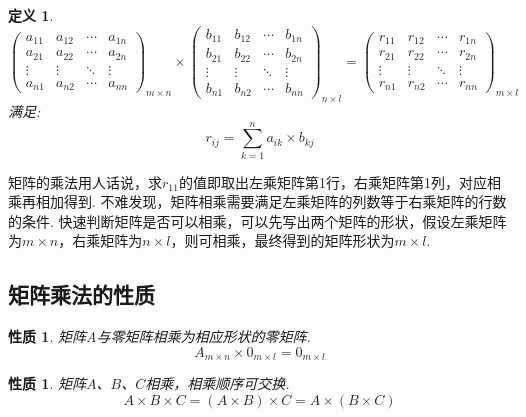 \documentclass[12pt, a4paper, oneside]{ctexbook}
\newtheorem{definition}[theorem]{定义}
\newtheorem{quolity}[theorem]{性质}
\begin{document}
\begin{definition}
    $$\left ( \begin{matrix}
        a_{11} & a_{12} & \cdots & a_{1n} \\
        a_{21} & a_{22} & \cdots & a_{2n} \\
        \vdots & \vdots & \ddots & \vdots \\
        a_{n1} & a_{n2} & \cdots & a_{nn}
    \end{matrix} \right )_{m \times n} \times \left ( \begin{matrix}
        b_{11} & b_{12} & \cdots & b_{1n} \\
        b_{21} & b_{22} & \cdots & b_{2n} \\
        \vdots & \vdots & \ddots & \vdots \\
        b_{n1} & b_{n2} & \cdots & b_{nn}
    \end{matrix} \right )_{n \times l} = \left ( \begin{matrix}
        r_{11} & r_{12} & \cdots & r_{1n} \\
        r_{21} & r_{22} & \cdots & r_{2n} \\
        \vdots & \vdots & \ddots & \vdots \\
        r_{n1} & r_{n2} & \cdots & r_{nn}
    \end{matrix} \right )_{m \times l}$$
    满足: $$r_{ij} = \sum_{k=1}^n a_{ik} \times b_{kj}$$
\end{definition}

矩阵的乘法用人话说，求$r_{11}$的值即取出左乘矩阵第1行，右乘矩阵第1列，对应相乘再相加得到. 不难发现，矩阵相乘需要满足左乘矩阵的列数等于右乘矩阵的行数的条件. 
快速判断矩阵是否可以相乘，可以先写出两个矩阵的形状，假设左乘矩阵为$m \times n$，右乘矩阵为$n \times l$，则可相乘，最终得到的矩阵形状为$m \times l$. 

\subsection{矩阵乘法的性质}

\begin{quolity}
    矩阵A与零矩阵相乘为相应形状的零矩阵. 
    $$A_{m \times n} \times 0_{m \times l} = 0_{m \times l}$$
\end{quolity}

\begin{quolity}
    矩阵$A$、$B$、$C$相乘，相乘顺序可交换. 
    $$A \times B \times C = (A \times B) \times C = A \times (B \times C)$$
\end{quolity}
\end{document}
